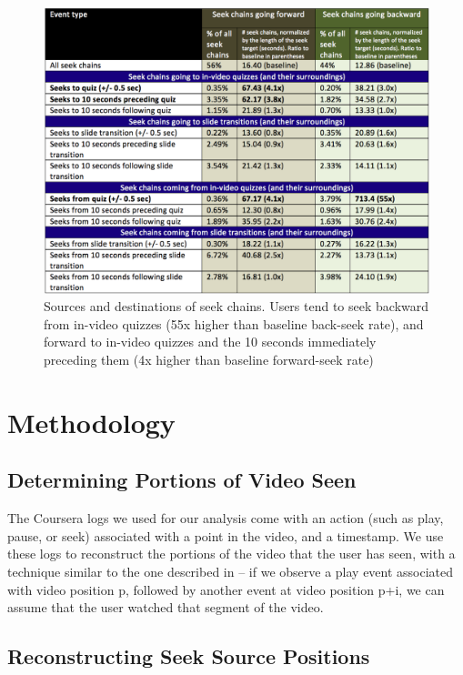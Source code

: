 \documentclass{sigchi}
\begin{document}
\begin{figure}
\includegraphics[width=1.0\columnwidth]{seek-sources-and-destinations-table}
\caption{Sources and destinations of seek chains. Users tend to seek backward from in-video quizzes (55x higher than baseline back-seek rate), and forward to in-video quizzes and the 10 seconds immediately preceding them (4x higher than baseline forward-seek rate)}
\label{fig:seek-sources-and-destinations-table}
\end{figure}

\section{Methodology}

\subsection{Determining Portions of Video Seen}

The Coursera logs we used for our analysis come with an action (such as play, pause, or seek) associated with a point in the video, and a timestamp. We use these logs to reconstruct the portions of the video that the user has seen, with a technique similar to the one described in \cite{juho} -- if we observe a play event associated with video position p, followed by another event at video position p+i, we can assume that the user watched that segment of the video.

\subsection{Reconstructing Seek Source Positions}
\end{document}

